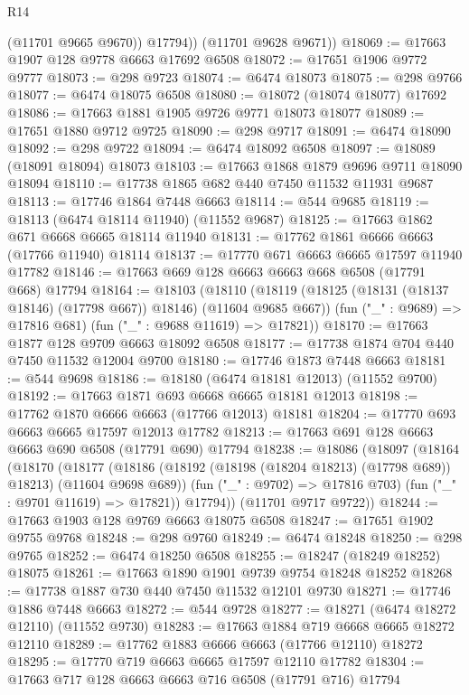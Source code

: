 \begin{lexlean}{R14}
\begin{coremodule}
{{{{{{{{{{{{{{{{{{{{{{{{{{{{{{{{{{{{{{{{{{{{{{{{{{{{{{{{{{{{{{{{{{{{{{{{{{{{{{{{{{            (@11701 @9665 @9670))
          @17794))
      (@11701 @9628 @9671))
@18069 := @17663 @1907 @128 @9778 @6663 @17692 @6508
@18072 := @17651 @1906 @9772 @9777
@18073 := @298 @9723
@18074 := @6474 @18073
@18075 := @298 @9766
@18077 := @6474 @18075 @6508
@18080 := @18072 (@18074 @18077) @17692
@18086 := @17663 @1881 @1905 @9726 @9771 @18073 @18077
@18089 := @17651 @1880 @9712 @9725
@18090 := @298 @9717
@18091 := @6474 @18090
@18092 := @298 @9722
@18094 := @6474 @18092 @6508
@18097 := @18089 (@18091 @18094) @18073
@18103 := @17663 @1868 @1879 @9696 @9711 @18090 @18094
@18110 := @17738 @1865 @682 @440 @7450 @11532 @11931 @9687
@18113 := @17746 @1864 @7448 @6663
@18114 := @544 @9685
@18119 := @18113 (@6474 @18114 @11940) (@11552 @9687)
@18125 := @17663 @1862 @671 @6668 @6665 @18114 @11940
@18131 := @17762 @1861 @6666 @6663 (@17766 @11940) @18114
@18137 := @17770 @671 @6663 @6665 @17597 @11940 @17782
@18146 := @17663 @669 @128 @6663 @6663 @668 @6508 (@17791 @668) @17794
@18164 := @18103
    (@18110
      (@18119 (@18125 (@18131 (@18137 @18146) (@17798 @667)) @18146) (@11604 @9685 @667))
      (fun ("_" : @9689) => @17816 @681)
      (fun ("_" : @9688 @11619) => @17821))
@18170 := @17663 @1877 @128 @9709 @6663 @18092 @6508
@18177 := @17738 @1874 @704 @440 @7450 @11532 @12004 @9700
@18180 := @17746 @1873 @7448 @6663
@18181 := @544 @9698
@18186 := @18180 (@6474 @18181 @12013) (@11552 @9700)
@18192 := @17663 @1871 @693 @6668 @6665 @18181 @12013
@18198 := @17762 @1870 @6666 @6663 (@17766 @12013) @18181
@18204 := @17770 @693 @6663 @6665 @17597 @12013 @17782
@18213 := @17663 @691 @128 @6663 @6663 @690 @6508 (@17791 @690) @17794
@18238 := @18086
    (@18097
      (@18164
        (@18170
          (@18177
            (@18186 (@18192 (@18198 (@18204 @18213) (@17798 @689)) @18213) (@11604 @9698 @689))
            (fun ("_" : @9702) => @17816 @703)
            (fun ("_" : @9701 @11619) => @17821))
          @17794))
      (@11701 @9717 @9722))
@18244 := @17663 @1903 @128 @9769 @6663 @18075 @6508
@18247 := @17651 @1902 @9755 @9768
@18248 := @298 @9760
@18249 := @6474 @18248
@18250 := @298 @9765
@18252 := @6474 @18250 @6508
@18255 := @18247 (@18249 @18252) @18075
@18261 := @17663 @1890 @1901 @9739 @9754 @18248 @18252
@18268 := @17738 @1887 @730 @440 @7450 @11532 @12101 @9730
@18271 := @17746 @1886 @7448 @6663
@18272 := @544 @9728
@18277 := @18271 (@6474 @18272 @12110) (@11552 @9730)
@18283 := @17663 @1884 @719 @6668 @6665 @18272 @12110
@18289 := @17762 @1883 @6666 @6663 (@17766 @12110) @18272
@18295 := @17770 @719 @6663 @6665 @17597 @12110 @17782
@18304 := @17663 @717 @128 @6663 @6663 @716 @6508 (@17791 @716) @17794
}}}}}}}}}}}}}}}}}}}}}}}}}}}}}}}}}}}}}}}}}}}}}}}}}}}}}}}}}}}}}}}}}}}}}}}}}}}}}}}}}}
\end{coremodule}
\end{lexlean}

